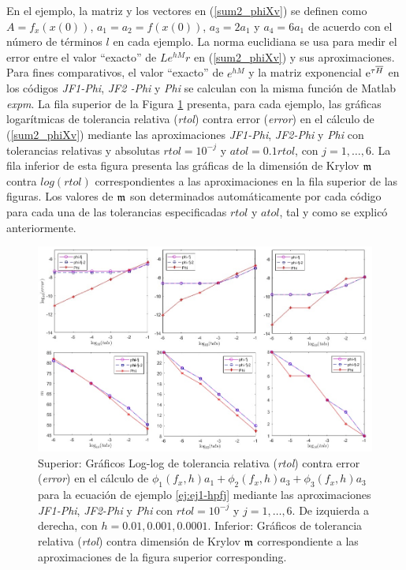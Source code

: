 En el ejemplo, la matriz y los vectores en (\ref{sum2_phiXv}) se definen como $A=f_x(x(0))$, $a_1=a_2=f(x(0))$, $a_3=2a_1 $ y $a_4=6a_1$ de acuerdo con el número de términos $l$ en cada ejemplo. La norma euclidiana se usa para medir el error entre el valor ``exacto'' de $L e^{h M}r$ en (\ref{sum2_phiXv}) y sus aproximaciones. Para fines comparativos, el valor ``exacto'' de $e^{h M}$ y la matriz exponencial $\mathrm{e}^{\tau\overline{H}}$ en los códigos \textit{JF1-Phi}, \textit{JF2 -Phi} y \textit{Phi} se calculan con la misma función de Matlab \textit{expm}. La fila superior de la Figura \ref{fig:SumPhiBrusselator} presenta, para cada ejemplo, las gráficas logarítmicas de tolerancia relativa (\textit{rtol}) contra error (\textit{error}) en el cálculo de (\ref{sum2_phiXv}) mediante las aproximaciones \textit{JF1-Phi}, \textit{JF2-Phi} y \textit{Phi} con tolerancias relativas y absolutas $rtol=10^{-j}$ y $atol=0.1 rtol$, con $j=1,\ldots,6$. La fila inferior de esta figura presenta las gráficas de la dimensión de Krylov $\mathfrak{m}$ contra $log(rtol)$ correspondientes a las aproximaciones en la fila superior de las figuras. Los valores de $\mathfrak{m}$ son determinados automáticamente por cada código para cada una de las tolerancias especificadas $rtol$ y $atol$, tal y como se explicó anteriormente.


\begin{figure}[htb]
	\includegraphics[scale=0.57]{Graphics/kpfj-brusselator-em.jpg}
	\caption{Superior: Gráficos Log-log de tolerancia relativa (\textit{rtol}) contra error (\textit{error}) en el cálculo de $\phi _{1}(f_x,h)a_{1}+\phi _{2}(f_x,h)a_{3}+\phi _{3}(f_x,h)a_{3}$ para la ecuación de ejemplo \ref{ej:ej1-hpfj} mediante las aproximaciones \textit{JF1-Phi}, \textit{JF2-Phi} y \textit{Phi} con $rtol=10^{-j}$ y $j=1,\ldots,6$. De izquierda a derecha, con $h=0.01,0.001,0.0001$. Inferior: Gráficos de tolerancia relativa (\textit{rtol}) contra dimensión de Krylov $\mathfrak{m}$ correspondiente a las aproximaciones de la figura superior corresponding.}
	\label{fig:SumPhiBrusselator}
\end{figure}

